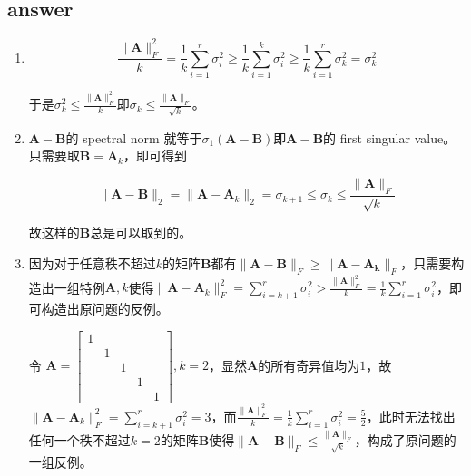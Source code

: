\documentclass[12pt]{article}
\begin{document}
\subsection*{answer}
\begin{enumerate}
	\item $$\frac{\|\mathbf A\|_F^2}{k} = \frac1k\sum_{i=1}^r\sigma_i^2 \ge \frac1k\sum_{i=1}^k\sigma_i^2 \ge \frac1k\sum_{i=1}^r\sigma_k^2 = \sigma_k^2$$
	
	于是$\sigma_k^2 \le \frac{\|\mathbf A\|_F^2}{k}$即$\sigma_k \le \frac{\|\mathbf A\|_F}{\sqrt k}$。
	
	\item $\mathbf A - \mathbf B$的 spectral norm 就等于$\sigma_1(\mathbf A - \mathbf B)$即$\mathbf A - \mathbf B$的 first singular value。只需要取$\mathbf B = \mathbf A_k$，即可得到
	
	$$\|\mathbf A - \mathbf B\|_2 = \|\mathbf A - \mathbf A_k\|_2 = \sigma_{k+1} \le \sigma_k \le \frac{\| \mathbf{A} \|_F}{\sqrt{k}}$$
	
	故这样的$\mathbf B$总是可以取到的。
	
	\item 因为对于任意秩不超过$k$的矩阵$\mathbf B$都有$\| \mathbf{A}-\mathbf{B} \|_F \ge \| \mathbf{A}-\mathbf{A_k} \|_F$，只需要构造出一组特例$\mathbf A, k$使得$\| \mathbf{A}-\mathbf{A}_k \|_F^2 = \sum_{i=k+1}^r\sigma_i^2 > \frac{\| \mathbf{A} \|_F^2}{k} = \frac{1}{k}\sum_{i=1}^{r}\sigma_i^2$，即可构造出原问题的反例。
	
	令 $\mathbf A = \begin{bmatrix}
	1&&&&\\
	&1&&&\\
	&&1&&\\
	&&&1&\\
	&&&&1
	\end{bmatrix}, k = 2$，显然$\mathbf A$的所有奇异值均为$1$，故$\| \mathbf{A}-\mathbf{A}_k \|_F^2 = \sum_{i=k+1}^r\sigma_i^2 = 3$，而$\frac{\| \mathbf{A} \|_F^2}{k} = \frac{1}{k}\sum_{i=1}^{r}\sigma_i^2 = \frac{5}{2}$，此时无法找出任何一个秩不超过$k=2$的矩阵$\mathbf B$使得$\| \mathbf{A}-\mathbf{B} \|_F \le \frac{\|\mathbf{A}\|_F}{\sqrt{k}}$，构成了原问题的一组反例。
	
\end{enumerate}

    
\end{document}
